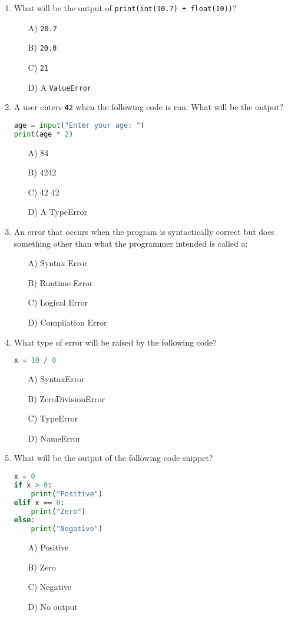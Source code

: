 \documentclass[9pt]{article}
\begin{document}
\begin{multicols}{2}
\begin{enumerate}
\item What will be the output of \texttt{print(int(10.7) + float(10))}?
\begin{enumerate}
    \item[A)] \texttt{20.7}
    \item[B)] \texttt{20.0}
    \item[C)] \texttt{21}
    \item[D)] A \texttt{ValueError}
\end{enumerate}

\item A user enters \texttt{42} when the following code is run. What will be the output?
\begin{lstlisting}[language=Python]
age = input("Enter your age: ")
print(age * 2)
\end{lstlisting}
\begin{enumerate}
\item[A)] 84
\item[B)] 4242
\item[C)] 42 42
\item[D)] A TypeError
\end{enumerate}

\item An error that occurs when the program is syntactically correct but does something other than what the programmer intended is called a:
\begin{enumerate}
    \item[A)] Syntax Error
    \item[B)] Runtime Error
    \item[C)] Logical Error
    \item[D)] Compilation Error
\end{enumerate}

\item What type of error will be raised by the following code?
\begin{lstlisting}[language=Python]
x = 10 / 0
\end{lstlisting}
\begin{enumerate}
\item[A)] SyntaxError
\item[B)] ZeroDivisionError
\item[C)] TypeError
\item[D)] NameError
\end{enumerate}

\item What will be the output of the following code snippet?
\begin{lstlisting}[language=Python]
x = 0
if x > 0:
    print("Positive")
elif x == 0:
    print("Zero")
else:
    print("Negative")
\end{lstlisting}
\begin{enumerate}
\item[A)] Positive
\item[B)] Zero
\item[C)] Negative
\item[D)] No output
\end{enumerate}


\end{enumerate}
\end{multicols}
\end{document}
